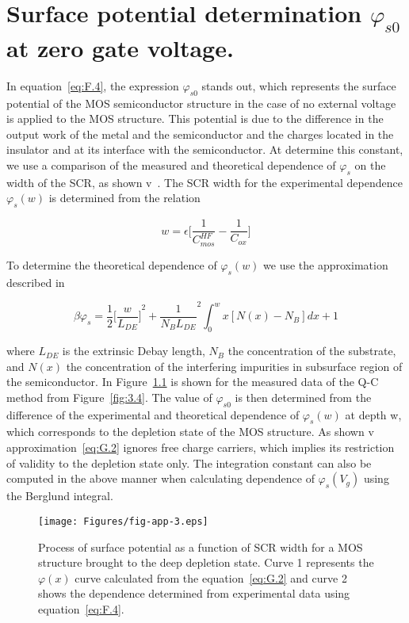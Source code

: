 
\chapter{Surface potential determination $\varphi_{s0}$ at zero gate voltage.}\label{app:AppendixG}

In equation~\ref{eq:F.4}, the expression $\varphi_{s0}$ stands out,
which represents the surface potential of the MOS semiconductor
structure in the case of no external voltage is applied to the MOS
structure.  This potential is due to the difference in the output work
of the metal and the semiconductor and the charges located in the
insulator and at its interface with the semiconductor. At determine
this constant, we use a comparison of the measured and theoretical
dependence of $\varphi_{s}$ on the width of the SCR, as shown
v~\cite{App.3}. The SCR width for the experimental dependence
$\varphi_{s}(w)$ is determined from the relation

\begin{equation}\label{eq:G.1}
  w = \epsilon \bigg[\frac{1}{C_{mos}^{HF}} - \frac{1}{C_{ox}}\bigg]
\end{equation}

To determine the theoretical dependence of $\varphi_{s}(w)$ we use the
approximation described in~\cite{App.5}

\begin{equation}\label{eq:G.2}
  \beta \varphi_{s} = \frac{1}{2} {\bigg[\frac{w}{L_{DE}}\bigg]}^2 + \frac{1}{N_{B}L_{DE}}^{2} \int_{0}^{w}x[N(x)-N_{B}]dx + 1
\end{equation}

where $L_{DE}$ is the extrinsic Debay length, $N_{B}$ the
concentration of the substrate, and $N(x)$ the concentration of the
interfering impurities in subsurface region of the semiconductor. In
Figure~\ref{fig:App.3} is shown for the measured data of the Q-C
method from Figure~\ref{fig:3.4}. The value of $\varphi_{s0}$ is then
determined from the difference of the experimental and theoretical
dependence of $\varphi_{s}(w)$ at depth w, which corresponds to the
depletion state of the MOS structure. As shown v~\cite{App.3}
approximation~\ref{eq:G.2} ignores free charge carriers, which implies
its restriction of validity to the depletion state only.  The
integration constant can also be computed in the above manner when
calculating dependence of $\varphi_{s}(V_{g})$ using the Berglund
integral.

\begin{figure}[h!]\centering
  \texttt{[image: Figures/fig-app-3.eps]}
    \caption[Surface potential as a function of SCR width for MOS
      structure driven to a deep depletion state]{Process of surface
      potential as a function of SCR width for a MOS structure brought
      to the deep depletion state.  Curve 1 represents the
      $\varphi(x)$ curve calculated from the equation~\ref{eq:G.2}
      and curve 2 shows the dependence determined from experimental
      data using equation~\ref{eq:F.4}.}\label{fig:App.3}
\end{figure}
